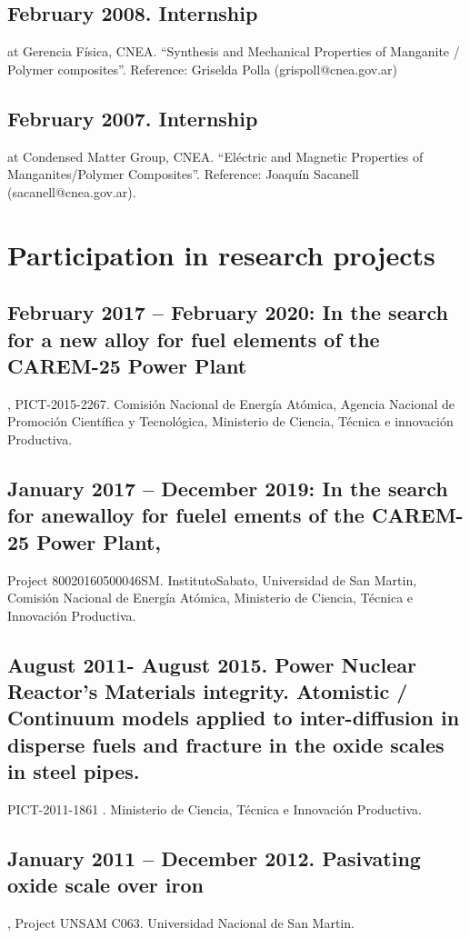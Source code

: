 \documentclass{my_cv}
\begin{document}
\subsection{February 2008. Internship }at Gerencia Física, CNEA. “Synthesis and Mechanical Properties of Manganite / Polymer composites”. Reference: Griselda Polla (grispoll@cnea.gov.ar)

\subsection{February 2007. Internship} at Condensed Matter Group, CNEA. “Eléctric and Magnetic Properties of Manganites/Polymer Composites”. Reference: Joaquín Sacanell (sacanell@cnea.gov.ar). 

\section{Participation in research projects}

\subsection{February 2017 – February 2020: In the search for a new alloy for fuel elements of the CAREM-25 Power Plant}, PICT-2015-2267. Comisión Nacional de Energía Atómica, Agencia Nacional de Promoción Científica y Tecnológica, Ministerio de Ciencia, Técnica e innovación Productiva.

\subsection{January 2017 – December 2019: In the search for anewalloy for fuelel ements of the CAREM-25 Power Plant, }Project 80020160500046SM. InstitutoSabato, Universidad de San Martin, Comisión Nacional de Energía Atómica, Ministerio de Ciencia, Técnica e Innovación Productiva.

\subsection{August 2011- August 2015. Power Nuclear Reactor’s Materials integrity. Atomistic / Continuum models applied to inter-diffusion in disperse fuels and fracture in the oxide scales in steel pipes.} PICT-2011-1861 . Ministerio de Ciencia, Técnica e Innovación Productiva. 

\subsection{January 2011 – December 2012. Pasivating oxide scale over iron}, Project UNSAM C063. Universidad Nacional de San Martin. 
\end{document}
